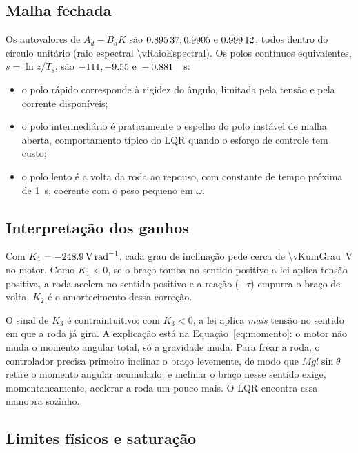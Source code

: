 \documentclass[11pt,a4paper]{article}
\begin{document}
\subsection{Malha fechada}

Os autovalores de $A_d - B_d K$ são $\num{0.89537}, \num{0.9905} \text{ e } \num{0.99912}$, todos dentro do círculo unitário (raio
espectral \num{\vRaioEspectral}). Os polos contínuos equivalentes, $s = \ln z / T_s$, são
$\num{-111}, \num{-9.55} \text{ e } \num{-0.881}$~\unit{\per\second}:
\begin{itemize}
  \item o polo rápido corresponde à rigidez do ângulo, limitada pela tensão e pela corrente
    disponíveis;
  \item o polo intermediário é praticamente o espelho do polo instável de malha aberta,
    comportamento típico do LQR quando o esforço de controle tem custo;
  \item o polo lento é a volta da roda ao repouso, com constante de tempo próxima de
    \qty{1}{\second}, coerente com o peso pequeno em $\omega$.
\end{itemize}

\subsection{Interpretação dos ganhos}
\label{sec:interpretacao}

Com $K_1 = \qty{-248.9}{\volt\per\radian}$, cada grau de inclinação pede cerca de
\qty{\vKumGrau}{\volt} no motor. Como $K_1 < 0$, se o braço tomba no sentido positivo a lei
aplica tensão positiva, a roda acelera no sentido positivo e a reação ($-\tau$) empurra o
braço de volta. $K_2$ é o amortecimento dessa correção.

O sinal de $K_3$ é contraintuitivo: com $K_3 < 0$, a lei aplica \emph{mais} tensão no sentido
em que a roda já gira. A explicação está na Equação~\eqref{eq:momento}: o motor não muda o
momento angular total, só a gravidade muda. Para frear a roda, o controlador precisa primeiro
inclinar o braço levemente, de modo que $Mgl\sin\theta$ retire o momento angular acumulado; e
inclinar o braço nesse sentido exige, momentaneamente, acelerar a roda um pouco mais. O LQR
encontra essa manobra sozinho.

\subsection{Limites físicos e saturação}
\end{document}
